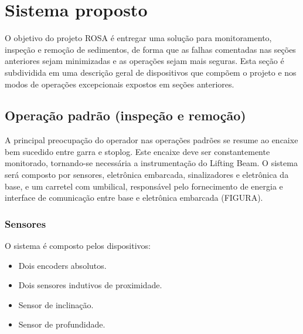 

\section{Sistema proposto}
O objetivo do projeto ROSA é entregar uma solução para monitoramento, inspeção e
remoção de sedimentos, de forma que as falhas comentadas nas seções anteriores
sejam minimizadas e as operações sejam mais seguras. Esta seção é subdividida em
uma descrição geral de dispositivos que compõem o projeto e nos modos de
operações excepcionais expostos em seções anteriores.



\subsection{Operação padrão (inspeção e remoção)}
A principal preocupação do operador nas operações padrões se resume ao encaixe
bem sucedido entre garra e stoplog. Este encaixe deve ser constantemente
monitorado, tornando-se necessária a instrumentação do Lifting Beam. O sistema
será composto por sensores, eletrônica embarcada, sinalizadores e eletrônica da
base, e um carretel com umbilical, responsável pelo fornecimento de energia e
interface de comunicação entre base e eletrônica embarcada (FIGURA).

\subsubsection{Sensores}
O sistema é composto pelos dispositivos:
\begin{itemize}
\item Dois encoders absolutos.
\item Dois sensores indutivos de proximidade.
\item Sensor de inclinação.
\item Sensor de profundidade.
\end{itemize}

